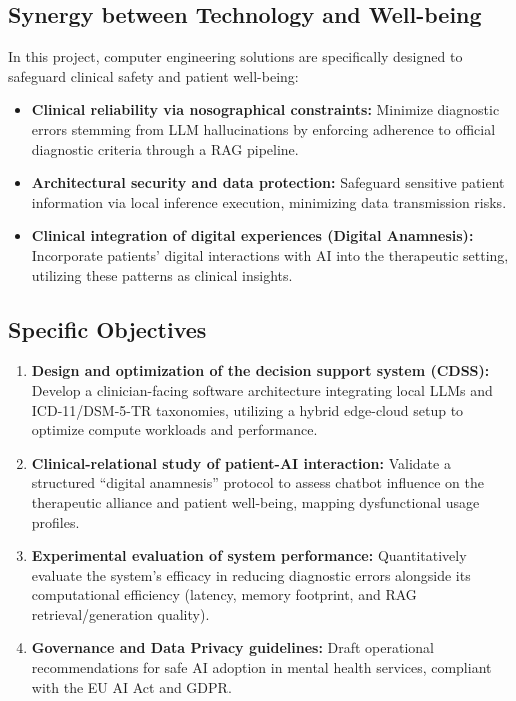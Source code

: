 \documentclass[11pt,a4paper]{article}
\begin{document}
\subsection{Synergy between Technology and Well-being}
In this project, computer engineering solutions are specifically designed to safeguard clinical safety and patient well-being:
\begin{itemize}
    \item \textbf{Clinical reliability via nosographical constraints:} Minimize diagnostic errors stemming from LLM hallucinations by enforcing adherence to official diagnostic criteria through a RAG pipeline.
    \item \textbf{Architectural security and data protection:} Safeguard sensitive patient information via local inference execution, minimizing data transmission risks.
    \item \textbf{Clinical integration of digital experiences (Digital Anamnesis):} Incorporate patients' digital interactions with AI into the therapeutic setting, utilizing these patterns as clinical insights.
\end{itemize}

\subsection{Specific Objectives}
\begin{enumerate}
    \item \textbf{Design and optimization of the decision support system (CDSS):} Develop a clinician-facing software architecture integrating local LLMs and ICD-11/DSM-5-TR taxonomies, utilizing a hybrid edge-cloud setup to optimize compute workloads and performance.
    \item \textbf{Clinical-relational study of patient-AI interaction:} Validate a structured ``digital anamnesis'' protocol to assess chatbot influence on the therapeutic alliance and patient well-being, mapping dysfunctional usage profiles.
    \item \textbf{Experimental evaluation of system performance:} Quantitatively evaluate the system's efficacy in reducing diagnostic errors alongside its computational efficiency (latency, memory footprint, and RAG retrieval/generation quality).
    \item \textbf{Governance and Data Privacy guidelines:} Draft operational recommendations for safe AI adoption in mental health services, compliant with the EU AI Act and GDPR.
\end{enumerate}
\end{document}
